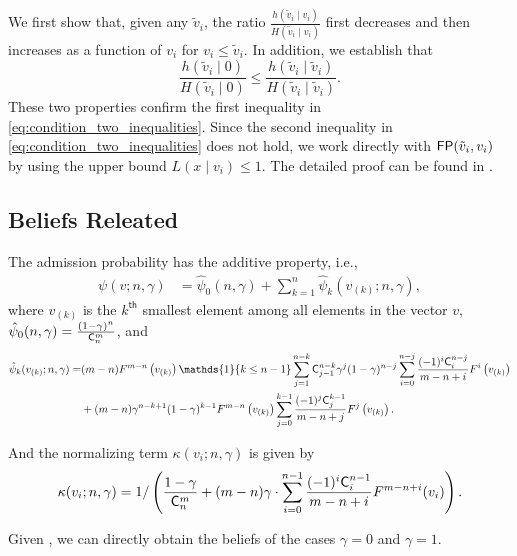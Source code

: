 We first show that, given any $\tilde{v}_i$, the ratio $\frac{h(\tilde{v}_i \mid v_i)}{H(\tilde{v}_i\mid v_i)}$ first decreases and then increases as a function of $v_i$ for $v_i\leq \tilde{v}_i$. In addition, we establish that 
\[
\frac{h(\tilde{v}_i \mid 0)}{H(\tilde{v}_i\mid 0)}\leq \frac{h(\tilde{v}_i \mid \tilde{v}_i)}{H(\tilde{v}_i\mid \tilde{v}_i)}.
\]
These two properties confirm the first inequality in \eqref{eq:condition_two_inequalities}. Since the second inequality in \eqref{eq:condition_two_inequalities} does not hold, we work directly with $\mathsf{FP}(\tilde{v}_i,v_i)$ by using the upper bound $L(x\mid v_i)\leq 1$. The detailed proof can be found in .






\subsection{Beliefs Releated}\label{app_subsec:beliefs}

\begin{lemma} 
\label{lem:closedforms_admission_prob}
The admission probability has the additive property, i.e.,  
\begin{align*}
 \psi(v;n,\gamma)  & = \hat{\psi}_0(n,\gamma)+\sum_{k=1}^n \hat{\psi}_k(v_{(k)};n,\gamma),
\end{align*}
where $v_{(k)}$ is the $k^{\mathsf{th}}$ smallest element among all elements in the vector $v$, $\hat{\psi}_0(n,\gamma) =  \frac{(1-\gamma)^n}{\mathsf{C}^{m}_n}$, and
\begin{align*}
 \hat{\psi}_k(v_{(k)};n,\gamma) =& (m-n) F^{m-n} \left(v_{(k)}\right)\mathds{1}\{k\leq n-1\}\sum_{j=1}^{n-k} \C^{n-k}_{j-1}\gamma^j
 (1-\gamma)^{n-j}\sum_{i=0}^{n-j}\frac{(-1)^{i}\C^{n-j}_i}{m-n+i}F^{i}\left(v_{(k)}\right)\\
 &+ (m-n) \gamma^{n-k+1}
 (1-\gamma)^{k-1}F^{m-n}\left(v_{(k)}\right)\sum_{j=0}^{k-1}\frac{(-1)^{j}\C^{k-1}_j}{m-n+j}F^{j}\left(v_{(k)}\right).  
\end{align*}

And the normalizing term $\kappa(v_i;n,\gamma)$ is given by
\begin{align*}
 \kappa(v_i;n,\gamma)  = 1/\left( \frac{1-\gamma}{\mathsf{C}^m_n} + (m-n)\gamma \cdot \sum_{i=0}^{n-1}\frac{(-1)^i\mathsf{C}^{n-1}_i}{m-n+i} F^{m-n+i}(v_i)\right) . 
\end{align*}
\end{lemma}

Given , we can directly obtain the beliefs of the cases $\gamma = 0$ and $\gamma = 1$.

